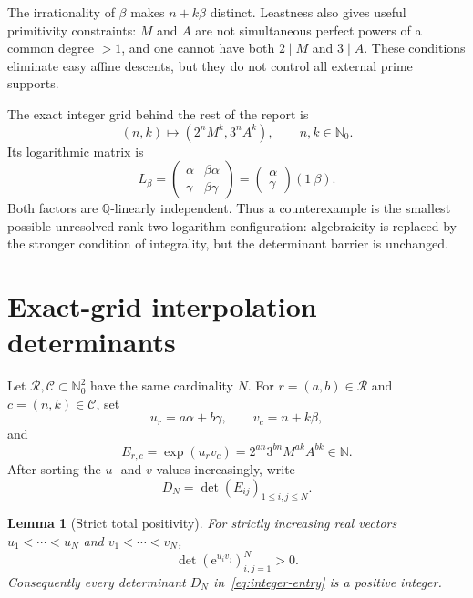 \documentclass[11pt]{article}
\newcommand{\N}{\mathbb N}
\newcommand{\Nzero}{\mathbb N_0}
\newcommand{\Q}{\mathbb Q}
\newcommand{\e}{\mathrm e}
\newcommand{\1}{\mathbf 1}
\theoremstyle{plain}
\newtheorem{lemma}[theorem]{Lemma}
\theoremstyle{definition}
\theoremstyle{remark}
\begin{document}
The irrationality of $\beta$ makes $n+k\beta$ distinct.  Leastness also gives
useful primitivity constraints: $M$ and $A$ are not simultaneous perfect
powers of a common degree $>1$, and one cannot have both $2\mid M$ and
$3\mid A$.  These conditions eliminate easy affine descents, but they do not
control all external prime supports.

The exact integer grid behind the rest of the report is
\begin{equation}\label{eq:counterexample-grid}
 (n,k)\longmapsto (2^nM^k,3^nA^k),\qquad n,k\in\Nzero.
\end{equation}
Its logarithmic matrix is
\begin{equation}\label{eq:Lbeta}
 L_\beta=
 \begin{pmatrix}\alpha&\beta\alpha\\ \gamma&\beta\gamma\end{pmatrix}
 =\begin{pmatrix}\alpha\\\gamma\end{pmatrix}(1\ \beta).
\end{equation}
Both factors are $\Q$-linearly independent.  Thus a counterexample is the
smallest possible unresolved rank-two logarithm configuration: algebraicity
is replaced by the stronger condition of integrality, but the determinant
barrier is unchanged.

\section{Exact-grid interpolation determinants}\label{sec:determinants}

Let $\mathcal R,\mathcal C\subset\Nzero^2$ have the same cardinality $N$.
For $r=(a,b)\in\mathcal R$ and $c=(n,k)\in\mathcal C$, set
\begin{equation}\label{eq:uv-grid}
 u_r=a\alpha+b\gamma,\qquad v_c=n+k\beta,
\end{equation}
and
\begin{equation}\label{eq:integer-entry}
 E_{r,c}=\exp(u_rv_c)
 =2^{an}3^{bn}M^{ak}A^{bk}\in\N.
\end{equation}
After sorting the $u$- and $v$-values increasingly, write
\[
 D_N=\det(E_{ij})_{1\le i,j\le N}.
\]

\begin{lemma}[Strict total positivity]\label{lem:total-positive}
For strictly increasing real vectors $u_1<\cdots<u_N$ and
$v_1<\cdots<v_N$,
\[
 \det(\e^{u_iv_j})_{i,j=1}^N>0.
\]
Consequently every determinant $D_N$ in~\eqref{eq:integer-entry} is a
positive integer.
\end{lemma}
\end{document}
